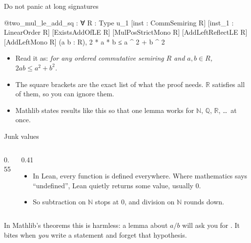 \documentclass[10pt, aspectratio=169]{beamer}
\begin{document}
\begin{frame}[fragile]{Do not panic at long signatures}
\begin{leanout}
@two_mul_le_add_sq : ∀ {R : Type u_1} [inst : CommSemiring R]
  [inst_1 : LinearOrder R] [ExistsAddOfLE R] [MulPosStrictMono R]
  [AddLeftReflectLE R] [AddLeftMono R] (a b : R),
  2 * a * b ≤ a ^ 2 + b ^ 2
\end{leanout}

\vspace{0.5em}
\begin{itemize}
\item Read it as: \emph{for any ordered commutative semiring $R$ and $a, b \in R$, \ $2ab \le a^2 + b^2$.}
\item The square brackets are the exact list of what the proof needs. $\mathbb{R}$ satisfies all of them, so you can ignore them.
\item Mathlib states results like this so that one lemma works for $\mathbb{N}$, $\mathbb{Q}$, $\mathbb{R}$, \dots\ at once.
\end{itemize}
\end{frame}

\begin{frame}[fragile]{Junk values}
\begin{columns}[T]
\begin{column}{0.55\textwidth}
\end{column}
\begin{column}{0.41\textwidth}
\begin{itemize}
\item In Lean, every function is defined everywhere. Where mathematics says ``undefined'', Lean quietly returns some value, usually $0$.
\item So subtraction on $\mathbb{N}$ stops at $0$, and division on $\mathbb{N}$ rounds down.
\end{itemize}
\end{column}
\end{columns}

\vspace{0.4em}
\begin{keypoint}
\normalsize In Mathlib's theorems this is harmless: a lemma about $a/b$ will ask you for . It bites when \emph{you} write a statement and forget that hypothesis.
\end{keypoint}
\end{frame}
\end{document}
